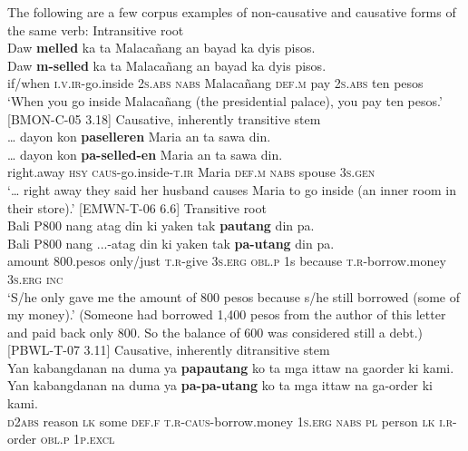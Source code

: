 The following are a few corpus examples of non-causative and causative forms of the same verb:
\ea
Intransitive root \\
Daw  \textbf{melled}  ka  ta  Malacañang  an  bayad  ka  dyis  pisos. \\\smallskip
\gll Daw  \textbf{m-selled}  ka  ta  Malacañang  an  bayad  ka  dyis  pisos. \\
if/when  \textsc{i.v.ir}-go.inside  2\textsc{s.abs}  \textsc{nabs}  Malacañang  \textsc{def.m}  pay  2\textsc{s.abs} ten  pesos \\
\glt ‘When you go inside Malacañang (the presidential palace), you pay ten pesos.’ [BMON-C-05 3.18]
\z
\ea
Causative, inherently transitive stem \\
 … dayon  kon  \textbf{paselleren}  Maria  an  ta  sawa  din. \\\smallskip
\gll … dayon  kon  \textbf{pa-selled-en}  Maria  an  ta  sawa  din. \\
 {}    right.away  \textsc{hsy}  \textsc{caus}-go.inside-\textsc{t.ir}  Maria  \textsc{def.m}  \textsc{nabs} spouse  3\textsc{s.gen} \\
\glt ‘… right away they said her husband causes Maria to go inside (an inner room in their store).’ [EMWN-T-06 6.6]
\z
\ea
Transitive root \\
Bali  P800  nang  atag  din  ki  yaken  tak  \textbf{pautang} din  pa. \\\smallskip
\gll Bali  P800  nang  ...-atag  din  ki  yaken  tak  \textbf{pa-utang} din  pa. \\
amount  800.pesos  only/just  \textsc{t.r}-give  3\textsc{s.erg}  \textsc{obl.p}  1s  because  \textsc{t.r}-borrow.money
3\textsc{s.erg}  \textsc{inc} \\
\glt `S/he only gave me the amount of 800 pesos because s/he still borrowed (some of my money).’ (Someone had borrowed 1,400 pesos from the author of this letter and paid back only 800. So the balance of 600 was considered still a debt.) [PBWL-T-07 3.11]
\z
\ea
Causative, inherently ditransitive stem \\
Yan  kabangdanan  na  duma  ya  \textbf{papautang}  ko ta  mga  ittaw  na  gaorder  ki  kami. \\\smallskip
\gll Yan  kabangdanan  na  duma  ya  \textbf{pa-pa-utang}  ko ta  mga  ittaw  na  ga-order  ki  kami. \\
\textsc{d}2\textsc{abs} reason \textsc{lk} some \textsc{def.f}  \textsc{t.r}-\textsc{caus}-borrow.money  1\textsc{s.erg} \textsc{nabs}  \textsc{pl} person  \textsc{lk}  \textsc{i.r}-order  \textsc{obl.p}  1\textsc{p.excl} \\
